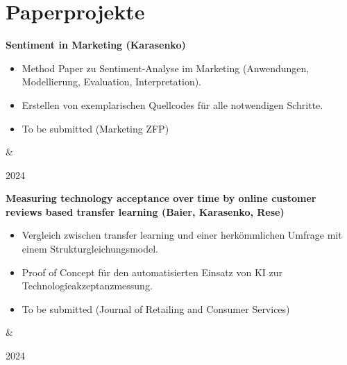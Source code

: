 \documentclass[10pt, a4paper]{article}
\newenvironment{highlights}{
        \begin{itemize}[
                topsep=0pt,
                parsep=0.10 cm,
                partopsep=0pt,
                itemsep=0pt,
                after=\vspace{-1\baselineskip},
                leftmargin=0.4 cm + 3pt
            ]
    }{
        \end{itemize}
    } %
\let\originalTabularx\tabularx
\let\originalEndTabularx\endtabularx
\renewenvironment{tabularx}{\bgroup\centering\originalTabularx}{\originalEndTabularx\par\egroup}
\begin{document}
    
    \section{Paperprojekte}

        \begin{tabularx}{
            \textwidth-0.4 cm-0.13cm
        }{
            K{0.2 cm}
            R{4.1 cm}
        }
            \textbf{Sentiment in Marketing (Karasenko)}

            \vspace{0.10 cm}

            \begin{highlights}
                \item Method Paper zu Sentiment-Analyse im Marketing (Anwendungen, Modellierung, Evaluation, Interpretation).
                \item Erstellen von exemplarischen Quellcodes für alle notwendigen Schritte.
                \item To be submitted (Marketing ZFP)
            \end{highlights}
            &
            

            2024
        \end{tabularx}


        \vspace{0.2 cm}
        \begin{tabularx}{
            \textwidth-0.4 cm-0.13cm
        }{
            K{0.2 cm}
            R{4.1 cm}
        }
            \textbf{Measuring technology acceptance over time by online customer reviews based transfer learning (Baier, Karasenko, Rese)}

            \vspace{0.10 cm}

            \begin{highlights}
                \item Vergleich zwischen transfer learning und einer herkömmlichen Umfrage mit einem Strukturgleichungsmodel.
                \item Proof of Concept für den automatisierten Einsatz von KI zur Technologieakzeptanzmessung.
                \item To be submitted (Journal of Retailing and Consumer Services)
            \end{highlights}
            &
            

            2024
        \end{tabularx}
\end{document}
